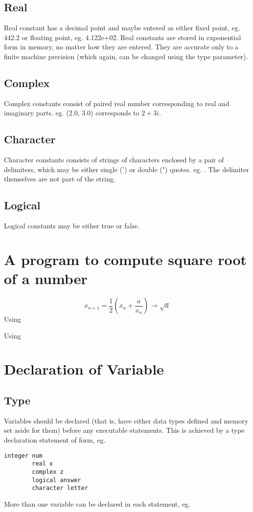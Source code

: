 \documentclass[class=book,crop=false]{standalone}
\begin{document}
    \subsection{Real}
    Real constant has a decimal point and maybe entered as either fixed point, eg. 442.2 or floating point, eg. 4.122e+02.
    Real constants are stored in exponential form in memory, no matter how they are entered. 
    They are accurate only to a finite machine precision (which again, can be changed using the  type parameter).
    \subsection{Complex}
    Complex constants consist of paired real number corresponding to real and imaginary parts. eg. (2.0, 3.0) corresponds to $ 2+3i $.
    \subsection{Character}
    Character constants consists of strings of characters enclosed by a pair of delimiters, which may be either single (') or double (") quotes. eg. . The delimiter themselves are not part of the string.
    \subsection{Logical}
    Logical constants may be either true or false.
    \section{A program to compute square root of a number}
    \[x_{n+1}=\frac{1}{2}\left(x_n+\frac{a}{x_n}\right)\to \sqrt{a}\]
    Using 
    
    Using 
    
    \section{Declaration of Variable}
    \subsection{Type}
    Variables should be declared (that is, have either data types defined and memory set aside for them) before any executable statements. This is achieved by a type declaration statement of form, eg. \begin{lstlisting}[numbers=none]
        integer num
        real x
        complex z
        logical answer
        character letter
    \end{lstlisting}
    More than one variable can be declared in each statement, eg. 
\end{document}
